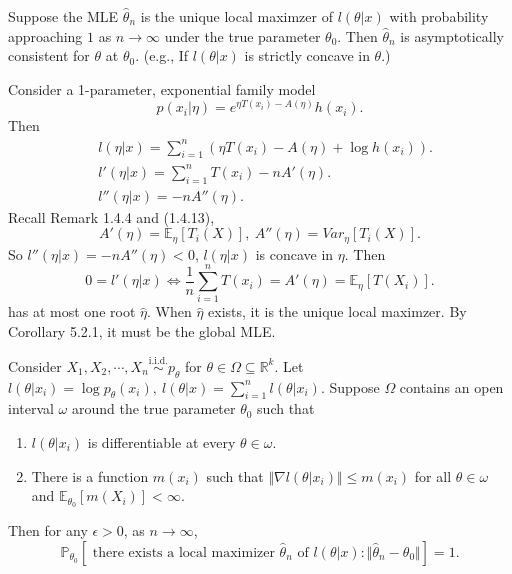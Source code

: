 \documentclass[a4paper]{article}
\begin{document}
\begin{cor}
	Suppose the MLE $\hat{\theta}_n$ is the unique local maximzer of $l(\theta|x)$ with probability approaching $1$ as $n \to \infty$ under the true parameter $\theta_0$. Then $\hat{\theta}_n$ is asymptotically consistent for $\theta$ at $\theta_0$. (e.g., If $l(\theta|x)$ is strictly concave in $\theta$.)
\end{cor}

\begin{eg}
	Consider a 1-parameter, exponential family model
	\begin{equation*}
		p(x_i|\eta) = e^{\eta T(x_i)-A(\eta)}h(x_i).
	\end{equation*}
	Then
	\begin{equation*}
		\begin{aligned}
			& l(\eta|x) = \sum\limits_{i=1}^n(\eta T(x_i) - A(\eta) + \log h(x_i)). \\
			& l'(\eta|x) = \sum\limits_{i=1}^n T(x_i) - nA'(\eta). \\
			& l''(\eta|x) = -nA''(\eta).
		\end{aligned}		
	\end{equation*}
	Recall Remark 1.4.4 and (1.4.13),
	\begin{equation*}
		A'(\eta) = \mathbb{E}_{\eta}[T_i(X)], \ A''(\eta) = Var_{\eta}[T_i(X)].
	\end{equation*}
	So $l''(\eta|x) = -nA''(\eta) < 0$, $l(\eta|x)$ is concave in $\eta$. Then
	\begin{equation*}
		0 = l'(\eta|x) \iff \frac{1}{n} \sum\limits_{i=1}^nT(x_i) = A'(\eta) = \mathbb{E}_{\eta}[T(X_i)].
	\end{equation*}
	has at most one root $\hat{\eta}$. When $\hat{\eta}$ exists, it is the unique local maximzer. By Corollary 5.2.1, it must be the global MLE.
\end{eg}

\begin{thm}
	Consider $X_1,X_2,\cdots,X_n \stackrel{\text{i.i.d.}}{\sim} p_{\theta}$ for $\theta \in \Omega \subseteq \mathbb{R}^k$. Let $l(\theta|x_i) = \log p_{\theta} (x_i), \ l(\theta|x) = \sum\limits_{i=1}^n l(\theta|x_i)$. Suppose $\Omega$ contains an open interval $\omega$ around the true parameter $\theta_0$ such that
	\begin{enumerate}
		\item $l(\theta|x_i)$ is differentiable at every $\theta \in \omega$.
		\item There is a function $m(x_i)$ such that $\Vert \nabla l(\theta|x_i)\Vert \leq m(x_i)$ for all $\theta \in \omega$ and $\mathbb{E}_{\theta_0}[m(X_i)] < \infty$.
	\end{enumerate}
	Then for any $\epsilon > 0$, as $n \to \infty$,
	\begin{equation}
		\mathbb{P}_{\theta_0}[\text{ there exists a local maximizer } \hat{\theta}_n \text{ of } l(\theta|x): \Vert \hat{\theta}_n - \theta_0 \Vert] = 1.
	\end{equation}
\end{thm}
\end{document}
